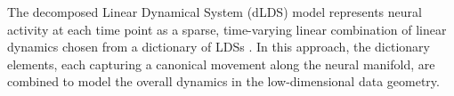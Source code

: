 \documentclass{article}
\newcommand{\ascomment}[1]{\textcolor{ascolor}{(#1)}}
\theoremstyle{definition} \newtheorem{definition}{Definition}  \newtheorem{example}{Example}
\theoremstyle{remark} \newtheorem{remark}{Remark}
\newcounter{ct}
\begin{document}
The decomposed Linear Dynamical System (dLDS) model represents neural activity at each time point as a sparse, time-varying linear combination of linear dynamics chosen from a dictionary of LDSs \citep{mudrik2024decomposed}.
 In this approach, the dictionary elements, each capturing a canonical movement along the neural manifold, are combined to model the overall dynamics in the low-dimensional data geometry.

%
%
%

 
\end{document}
